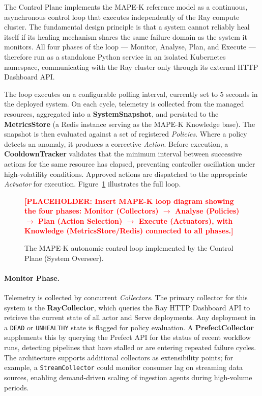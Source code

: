 \documentclass[12pt, a4paper]{report}
\newcommand{\placeholder}[1]{%
  \textcolor{red}{\textbf{[PLACEHOLDER: #1]}}%
}
\begin{document}
The Control Plane implements the MAPE-K reference model \citep{kephart2003} as a
continuous, asynchronous control loop that executes independently of the Ray compute
cluster.
The fundamental design principle is that a system cannot reliably heal itself if its
healing mechanism shares the same failure domain as the system it monitors.
All four phases of the loop — Monitor, Analyse, Plan, and Execute — therefore run as
a standalone Python service in an isolated Kubernetes namespace, communicating with
the Ray cluster only through its external HTTP Dashboard API.

The loop executes on a configurable polling interval, currently set to 5 seconds in
the deployed system.
On each cycle, telemetry is collected from the managed resources, aggregated into a
\textbf{SystemSnapshot}, and persisted to the \textbf{MetricsStore} (a Redis instance
serving as the MAPE-K Knowledge base).
The snapshot is then evaluated against a set of registered \emph{Policies}.
Where a policy detects an anomaly, it produces a corrective \emph{Action}.
Before execution, a \textbf{CooldownTracker} validates that the minimum interval
between successive actions for the same resource has elapsed, preventing controller
oscillation under high-volatility conditions.
Approved actions are dispatched to the appropriate \emph{Actuator} for execution.
Figure~\ref{fig:mapek_loop} illustrates the full loop.

\begin{figure}[H]
  \centering
  \placeholder{Insert MAPE-K loop diagram showing the four phases:
  Monitor (Collectors) $\rightarrow$ Analyse (Policies) $\rightarrow$
  Plan (Action Selection) $\rightarrow$ Execute (Actuators),
  with Knowledge (MetricsStore/Redis) connected to all phases.}
  \caption{The MAPE-K autonomic control loop implemented by the Control Plane
  (System Overseer).}
  \label{fig:mapek_loop}
\end{figure}

\paragraph{Monitor Phase.}
Telemetry is collected by concurrent \emph{Collectors}.
The primary collector for this system is the \textbf{RayCollector}, which queries the
Ray HTTP Dashboard API to retrieve the current state of all actor and Serve deployments.
Any deployment in a \texttt{DEAD} or \texttt{UNHEALTHY} state is flagged for policy
evaluation.
A \textbf{PrefectCollector} supplements this by querying the Prefect API for the
status of recent workflow runs, detecting pipelines that have stalled or are entering
repeated failure cycles.
The architecture supports additional collectors as extensibility points; for example,
a \texttt{StreamCollector} could monitor consumer lag on streaming data sources, enabling
demand-driven scaling of ingestion agents during high-volume periods.
\end{document}
